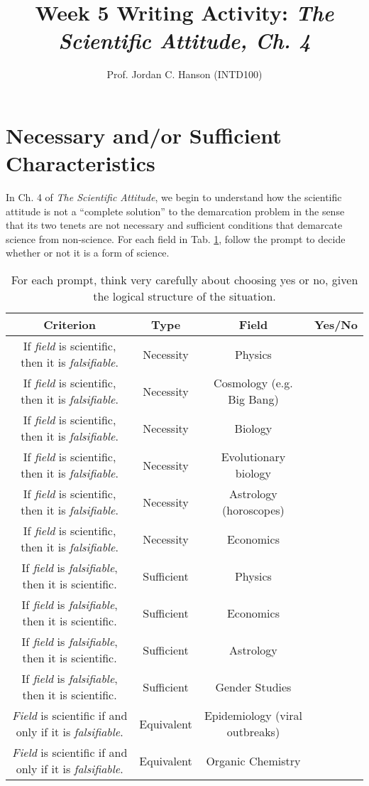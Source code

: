 \documentclass{article}
\begin{document}
\title{Week 5 Writing Activity: \textit{The Scientific Attitude, Ch. 4}}
\author{Prof. Jordan C. Hanson (INTD100)}

\maketitle

\section{Necessary and/or Sufficient Characteristics}

In Ch. 4 of \textit{The Scientific Attitude}, we begin to understand how the scientific attitude is not a ``complete solution'' to the demarcation problem in the sense that its two tenets are not necessary and sufficient conditions that demarcate science from non-science.  For each field in Tab. \ref{tab:1}, follow the prompt to decide whether or not it is a form of science.

\begin{table}[ht]
\centering
\begin{tabular}{| c | c | c | c |}
\hline
Criterion & Type & Field & Yes/No \\ \hline \hline
If \textit{field} is scientific, then it is \textit{falsifiable}. & Necessity & Physics & \\ \hline
If \textit{field} is scientific, then it is \textit{falsifiable}. & Necessity & Cosmology (e.g. Big Bang) & \\ \hline
If \textit{field} is scientific, then it is \textit{falsifiable}. & Necessity & Biology & \\ \hline
If \textit{field} is scientific, then it is \textit{falsifiable}. & Necessity & Evolutionary biology & \\ \hline
If \textit{field} is scientific, then it is \textit{falsifiable}. & Necessity & Astrology (horoscopes) & \\ \hline
If \textit{field} is scientific, then it is \textit{falsifiable}. & Necessity & Economics & \\ \hline
If \textit{field} is \textit{falsifiable}, then it is scientific. & Sufficient & Physics & \\ \hline
If \textit{field} is \textit{falsifiable}, then it is scientific. & Sufficient & Economics & \\ \hline
If \textit{field} is \textit{falsifiable}, then it is scientific. & Sufficient & Astrology & \\ \hline
If \textit{field} is \textit{falsifiable}, then it is scientific. & Sufficient & Gender Studies & \\ \hline
\textit{Field} is scientific if and only if it is \textit{falsifiable}. & Equivalent & Epidemiology (viral outbreaks) & \\ \hline
\textit{Field} is scientific if and only if it is \textit{falsifiable}. & Equivalent & Organic Chemistry & \\ \hline
\end{tabular}
\caption{\label{tab:1} For each prompt, think very carefully about choosing yes or no, given the logical structure of the situation.}
\end{table}
\end{document}

